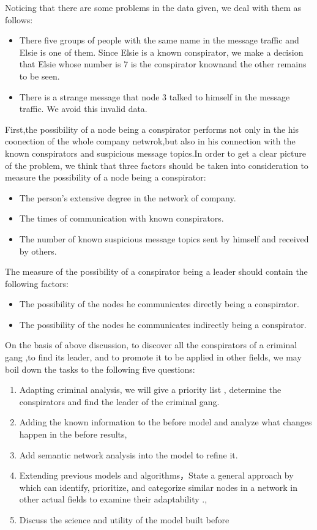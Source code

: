\documentclass[12pt]{article}
\begin{document}
	Noticing that there are some problems in the data given, we deal with them as follows: 
\begin{itemize}
\item There five groups of people with the same name in the message traffic and Elsie is one of them. Since Elsie is a known conspirator, we make a decision that Elsie whose number is 7 is the conspirator knownand the other remains to be seen. 
\item There is a strange message that node 3 talked to himself in the message traffic. We avoid this invalid data.
\end{itemize}
	First,the possibility of a node being a conspirator performs not only in the his coonection of the whole company netwrok,but also in his connection with the known conspirators and suspicious message topics.In order to get a clear picture of the problem, we think that three factors should be taken into consideration to measure the possibility of a node being a conspirator:
\begin{itemize}
\item The person’s extensive degree in the network of company.
\item The times of communication with known conspirators.
\item The number of known suspicious message topics sent by himself and received by others.
\end{itemize}
	The measure of the possibility of a conspirator being a leader should contain the following factors:
\begin{itemize}
\item The possibility of the nodes he communicates directly being a conspirator.
\item The possibility of the nodes he communicates indirectly being a conspirator.
\end{itemize}

	On the basis of above discussion, to discover all the conspirators of a criminal gang ,to find its leader, and to promote it to be applied in other fields, we may boil down the tasks to the following five questions:
\begin{enumerate}
\item Adapting criminal analysis, we will give a priority list , determine the conspirators and find the leader of the criminal gang.
\item Adding the known information to the before model and analyze what changes happen in the before results,
\item Add semantic network analysis into the model to refine it.
\item Extending previous models and algorithms，State a general approach by which can identify, prioritize, and categorize similar nodes in a network in other actual fields to examine their adaptability ., 
\item Discuss the science and utility of the model built before
\end{enumerate}
\end{document}
